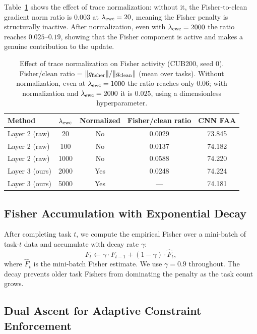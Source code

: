 Table~\ref{tab:norm_ratio} shows the effect of trace normalization: without it,
the Fisher-to-clean gradient norm ratio is $0.003$ at $\lambda_{\mathrm{ewc}}=20$,
meaning the Fisher penalty is structurally inactive.
After normalization, even with $\lambda_{\mathrm{ewc}}=2000$ the ratio reaches $0.025$--$0.19$,
showing that the Fisher component is active and makes a genuine contribution to the update.

\begin{table}[h]
\caption{Effect of trace normalization on Fisher activity (CUB200, seed 0).
Fisher/clean ratio = $\|g_{\mathrm{fisher}}\| / \|g_{\mathrm{clean}}\|$ (mean over tasks).
Without normalization, even at $\lambda_{\mathrm{ewc}}=1000$ the ratio reaches only $0.06$;
with normalization and $\lambda_{\mathrm{ewc}}=2000$ it is $0.025$, using a dimensionless hyperparameter.}
\label{tab:norm_ratio}
\centering
\begin{tabular}{lcccc}
\toprule
Method & $\lambda_{\mathrm{ewc}}$ & Normalized & Fisher/clean ratio & CNN FAA \\
\midrule
Layer 2 (raw) & 20   & No  & 0.0029 & 73.845 \\
Layer 2 (raw) & 100  & No  & 0.0137 & 74.182 \\
Layer 2 (raw) & 1000 & No  & 0.0588 & 74.220 \\
\midrule
Layer 3 (ours) & 2000 & Yes & 0.0248 & 74.224 \\
Layer 3 (ours) & 5000 & Yes & ---    & 74.181 \\
\bottomrule
\end{tabular}
\end{table}

\subsection{Fisher Accumulation with Exponential Decay}
\label{sec:fisher_accum}

After completing task $t$, we compute the empirical Fisher over a mini-batch of task-$t$ data
and accumulate with decay rate $\gamma$:
\begin{equation}
  F_t \leftarrow \gamma \cdot F_{t-1} + (1-\gamma) \cdot \hat{F}_t,
\end{equation}
where $\hat{F}_t$ is the mini-batch Fisher estimate.
We use $\gamma = 0.9$ throughout.
The decay prevents older task Fishers from dominating the penalty as the task count grows.

\subsection{Dual Ascent for Adaptive Constraint Enforcement}
\label{sec:dual_ascent}

